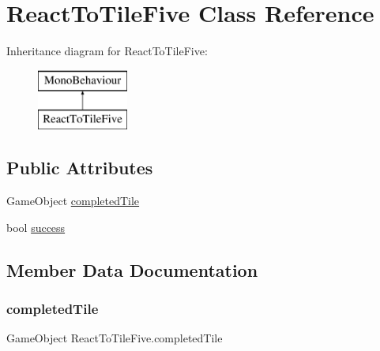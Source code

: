 \hypertarget{class_react_to_tile_five}{}\section{React\+To\+Tile\+Five Class Reference}
\label{class_react_to_tile_five}
Inheritance diagram for React\+To\+Tile\+Five\+:\begin{figure}[H]
\begin{center}
\leavevmode
\includegraphics[height=2.000000cm]{class_react_to_tile_five}
\end{center}
\end{figure}
\subsection*{Public Attributes}
\begin{DoxyCompactItemize}
\item 
Game\+Object \hyperlink{class_react_to_tile_five_aea5550fe90e75031f1e1a7a4360ae72b}{completed\+Tile}
\item 
bool \hyperlink{class_react_to_tile_five_abbb81d5ab714e7c6ad8792a5d359e354}{success}
\end{DoxyCompactItemize}


\subsection{Member Data Documentation}
\mbox{\label{class_react_to_tile_five_aea5550fe90e75031f1e1a7a4360ae72b}} 
\subsubsection{\texorpdfstring{completed\+Tile}{completedTile}}
{\footnotesize\ttfamily Game\+Object React\+To\+Tile\+Five.\+completed\+Tile}

\mbox{\label{class_react_to_tile_five_abbb81d5ab714e7c6ad8792a5d359e354}} 
